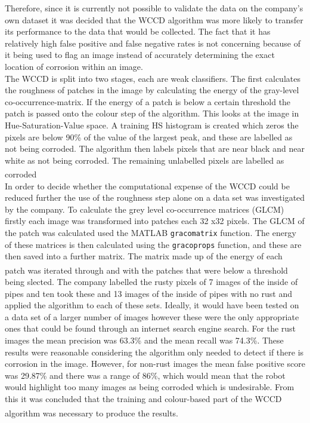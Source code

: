 \documentclass[11pt]{article}		%
\newcommand{\supercite}[1]{\textsuperscript{\cite{#1}}}		%
\begin{document}
	        Therefore, since it is currently not possible to validate the data on the company's own dataset it was decided that the WCCD algorithm was more likely to transfer its performance to the data that would be collected. The fact that it has relatively high false positive and false negative rates is not concerning because of it being used to flag an image instead of accurately determining the exact location of corrosion within an image.
	        \\
		    The WCCD is split into two stages, each are weak classifiers. The first calculates the roughness of patches in the image by calculating the energy of the gray-level co-occurrence-matrix. If the energy of a patch is below a certain threshold the patch is passed onto the colour step of the algorithm. This looks at the image in Hue-Saturation-Value space. A training HS histogram is created which zeros the pixels are below 90\% of the value of the largest peak, and these are labelled as not being corroded. The algorithm then labels pixels that are near black and near white as not being corroded. The remaining unlabelled pixels are labelled as corroded\supercite{WCCD}  
		    \\
	        In order to decide whether the computational expense of the WCCD could be reduced further the use of the roughness step alone on a data set was investigated by the company. To calculate the grey level co-occurrence matrices (GLCM) firstly each image was transformed into patches each 32 x32 pixels. The GLCM of the patch was calculated used the MATLAB \verb|gracomatrix| function. The energy of these matrices is then calculated using the \verb|gracoprops| function, and these are then saved into a further matrix. The matrix made up of the energy of each patch was iterated through and with the patches that were below a threshold\supercite{WCCD} being slected. The company labelled the rusty pixels of 7 images of the inside of pipes and ten took these and 13 images of the inside of pipes with no rust  and applied the algorithm to each of these sets. Ideally, it would have been tested on a data set of a larger number of images however these were the only appropriate ones that could be found through an internet search engine search. For the rust images the mean precision was 63.3\% and the mean recall was 74.3\%. These results were reasonable considering the algorithm only needed to detect if there is corrosion in the image. However, for non-rust images the mean false positive score was 29.87\% and there was a range of 86\%, which would mean that the robot would highlight too many images as being corroded which is undesirable. From this it was concluded that the training and colour-based part of the WCCD algorithm was necessary to produce the results.\supercite{WCCD}  
\end{document}
